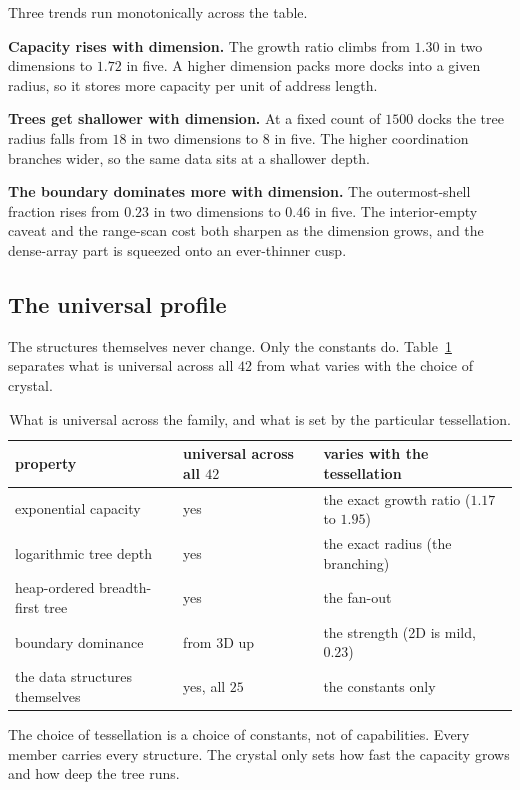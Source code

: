 Three trends run monotonically across the table.

\textbf{Capacity rises with dimension.} The growth ratio climbs from $1.30$ in two dimensions to $1.72$ in five. A higher dimension packs more docks into a given radius, so it stores more capacity per unit of address length.

\textbf{Trees get shallower with dimension.} At a fixed count of $1500$ docks the tree radius falls from $18$ in two dimensions to $8$ in five. The higher coordination branches wider, so the same data sits at a shallower depth.

\textbf{The boundary dominates more with dimension.} The outermost-shell fraction rises from $0.23$ in two dimensions to $0.46$ in five. The interior-empty caveat and the range-scan cost both sharpen as the dimension grows, and the dense-array part is squeezed onto an ever-thinner cusp.

\subsection{The universal profile}

The structures themselves never change. Only the constants do. Table~\ref{tab:universal} separates what is universal across all $42$ from what varies with the choice of crystal.

\begin{table}[ht]
\centering
\begin{tabular}{@{}lll@{}}
\toprule
property & universal across all $42$ & varies with the tessellation \\
\midrule
exponential capacity & yes & the exact growth ratio ($1.17$ to $1.95$) \\
logarithmic tree depth & yes & the exact radius (the branching) \\
heap-ordered breadth-first tree & yes & the fan-out \\
boundary dominance & from 3D up & the strength (2D is mild, $0.23$) \\
the data structures themselves & yes, all $25$ & the constants only \\
\bottomrule
\end{tabular}
\caption{What is universal across the family, and what is set by the particular tessellation.}
\label{tab:universal}
\end{table}

\begin{principle}
The choice of tessellation is a choice of constants, not of capabilities. Every member carries every structure. The crystal only sets how fast the capacity grows and how deep the tree runs.
\end{principle}

